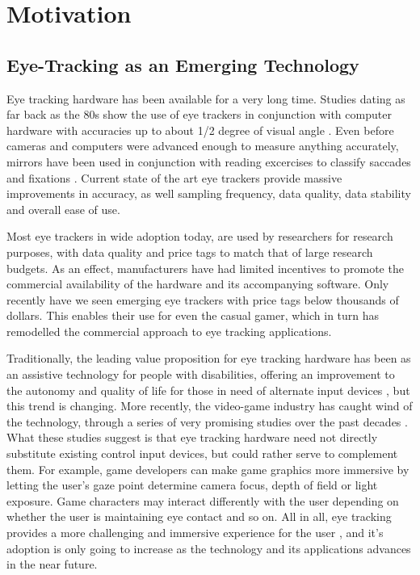 \section{Motivation} \label{sec:intro/motivation}

\subsection{Eye-Tracking as an Emerging Technology}

Eye tracking hardware has been available for a very long time. Studies dating as far back as the 80s show the use of eye trackers in conjunction with computer hardware with accuracies up to about 1/2 degree of visual angle \cite{colin1986}. Even before cameras and computers were advanced enough to measure anything accurately, mirrors have been used in conjunction with reading excercises to classify saccades and fixations \cite{vanGog2013}. Current state of the art eye trackers provide massive improvements in accuracy, as well sampling frequency, data quality, data stability and overall ease of use.

Most eye trackers in wide adoption today, are used by researchers for research purposes, with data quality and price tags to match that of large research budgets. As an effect, manufacturers have had limited incentives to promote the commercial availability of the hardware and its accompanying software. Only recently have we seen emerging eye trackers with price tags below thousands of dollars. This enables their use for even the casual gamer, which in turn has remodelled the commercial approach to eye tracking applications.

Traditionally, the leading value proposition for eye tracking hardware has been as an assistive technology for people with disabilities, offering an improvement to the autonomy and quality of life for those in need of alternate input devices \cite{barry1994, corno2002}, but this trend is changing. More recently, the video-game industry has caught wind of the technology, through a series of very promising studies over the past decades \cite{leyba2004, smith2006, tobii2017}. What these studies suggest is that eye tracking hardware need not directly substitute existing control input devices, but could rather serve to complement them. For example, game developers can make game graphics more immersive by letting the user's gaze point determine camera focus, depth of field or light exposure. Game characters may interact differently with the user depending on whether the user is maintaining eye contact and so on. All in all, eye tracking provides a more challenging and immersive experience for the user \cite{antunes2018}, and it's adoption is only going to increase as the technology and its applications advances in the near future.

